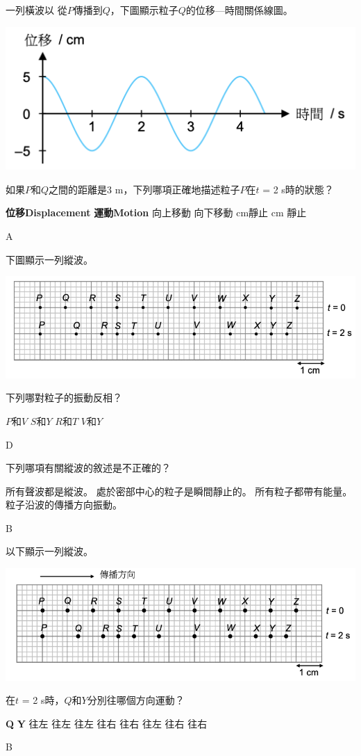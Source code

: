 {
    一列橫波以  從$P$傳播到$Q$，下圖顯示粒子$Q$的位移—時間關係線圖。
    \par{\par\centering\includegraphics[width=.45\textwidth]{./img/ch1_earlyclass_wave_mc_2024-05-13-16-13-07.png}\par}
    如果$P$和$Q$之間的距離是3 m，下列哪項正確地描述粒子$P$在$t$ = 2 s時的狀態？
    \begin{tasks}
        \task [] \textbf{位移Displacement} \tab\tab \textbf{運動Motion}
        \tab\tab 向上移動
        \tab\tab 向下移動
         cm\tab\tab 靜止
         cm \tab\tab 靜止
    \end{tasks}
}{\mckey A}

{
    下圖顯示一列縱波。
    \par{\par\centering\includegraphics[width=.6\textwidth]{./img/ch1_earlyclass_wave_mc_2024-05-13-16-15-20.png}\par}
    下列哪對粒子的振動反相？
    \begin{tasks}
        \task $P$和$V$
        \task $S$和$Y$
        \task $R$和$T$
        \task $V$和$Y$
    \end{tasks}

}{\mckey D}

{
    下列哪項有關縱波的敘述是不正確的？
    \begin{tasks}
        \task 所有聲波都是縱波。
        \task 處於密部中心的粒子是瞬間靜止的。
        \task 所有粒子都帶有能量。
        \task 粒子沿波的傳播方向振動。
    \end{tasks}

}{\mckey B}

{
    以下顯示一列縱波。
    \par{\par\centering\includegraphics[width=.6\textwidth]{./img/ch1_earlyclass_wave_mc_2024-05-13-16-17-43.png}\par}
    在$t$ = 2 s時，$Q$和$Y$分別往哪個方向運動？
    \begin{tasks}
        \task [] \textbf{Q} \tab\tab \textbf{Y}
        \task 往左 \tab\tab 往左
        \task 往左 \tab\tab 往右
        \task 往右 \tab\tab 往左
        \task 往右 \tab\tab 往右
    \end{tasks}
}{\mckey B}

